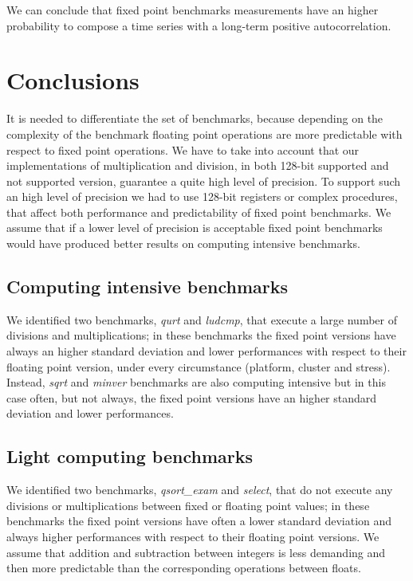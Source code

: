 We can conclude that fixed point benchmarks measurements have an higher probability to compose a time series with a long-term positive autocorrelation.

\section{Conclusions}
It is needed to differentiate the set of benchmarks, because depending on the complexity of the benchmark floating point operations are more predictable with respect to fixed point operations.\newline
We have to take into account that our implementations of multiplication and division, in both 128-bit supported and not supported version, guarantee a quite high level of precision.
To support such an high level of precision we had to use 128-bit registers or complex procedures, that affect both performance and predictability of fixed point benchmarks. We assume that if a lower level of precision is acceptable fixed point benchmarks would have produced better results on computing intensive benchmarks.
 
\subsection{Computing intensive benchmarks}
We identified two benchmarks, \textit{qurt} and \textit{ludcmp}, that execute a large number of divisions and multiplications; in these benchmarks the fixed point versions have always an higher standard deviation and lower performances with respect to their floating point version, under every circumstance (platform, cluster and stress).
Instead, \textit{sqrt} and \textit{minver} benchmarks are also computing intensive but in this case often, but not always, the fixed point versions have an higher standard deviation and lower performances.

\subsection{Light computing benchmarks}
We identified two benchmarks, \textit{qsort\_exam} and \textit{select}, that do not execute any divisions or multiplications between fixed or floating point values; in these benchmarks the fixed point versions have often a lower standard deviation and always higher performances with respect to their floating point versions.\newline
We assume that addition and subtraction between integers is less demanding and then more predictable than the corresponding operations between floats.

